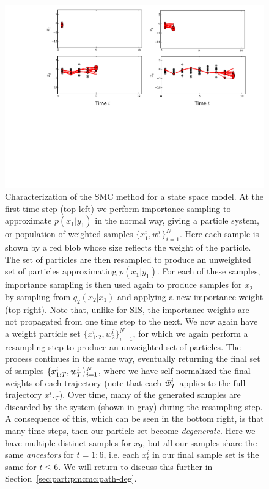 \begin{figure}[t]
	\centering 
	\includegraphics[width=\textwidth]{part/figures/smc_explan}
	\caption{Characterization of the SMC method for a state space model.  At the first time step (top left) 
		we perform importance sampling to approximate $p(x_1 | y_1)$ in the normal way, giving a particle system, or population
		of weighted samples $\{x_1^i,w_1^i\}_{i=1}^N$.  Here each sample is shown by a red blob whose size reflects the weight
		of the particle.  The set of particles are then resampled to produce an unweighted set of particles approximating
		$p(x_1 | y_1)$.  For each of these samples, importance sampling is then used again to produce samples for $x_2$
		by sampling from $q_2 (x_2 | x_1)$ and applying a new importance weight (top right).  Note that, unlike for SIS,
		the importance weights are not propagated from one time step to the next.
		We now again have a weight particle set $\{x_{1:2}^i,w_2^i\}_{i=1}^N$, for which we again perform a resampling
		step to produce an unweighted set of particles.  The process continues in the same way, eventually returning the
		final set of samples $\{x_{1:T}^i,\bar w_T^i\}_{i=1}^N$, where we have self-normalized the final weights of each trajectory
		(note that each $\bar w_T^i$ applies to the full trajectory $x_{1:T}^i$).  
		Over time, many of the generated samples are
		discarded by the system (shown in gray) during the resampling step.  A consequence of this, which can be seen
		in the bottom right, is that
		many time steps, then our particle set become \emph{degenerate}.  Here we have multiple distinct samples for $x_9$, but
		all our samples share the same \emph{ancestors} for $t=1:6$, i.e. each $x_t^i$ in our final sample set is
		the same for $t\le6$.  We will return to discuss this further in Section~\ref{sec:part:pmcmc:path-deg}.
		\label{fig:part:smc_explan}}
\end{figure}

